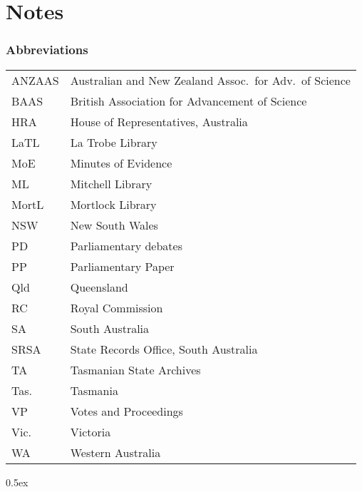 
\chapter{Notes}
\label{ch:notes}


\small

\subsection*{Abbreviations} 

\begin{tabular}{ll}
	ANZAAS	& Australian and New Zealand Assoc.\ for Adv.\ of
                              Science\\
       	BAAS	& British Association for Advancement of Science\\
	HRA	& House of Representatives, Australia\\
	LaTL	& La Trobe Library\\
	MoE	& Minutes of Evidence\\
	ML	& Mitchell Library\\
	MortL	& Mortlock Library\\
	NSW	& New South Wales\\
	PD	& Parliamentary debates\\
	PP	& Parliamentary Paper\\
	Qld	& Queensland\\
	RC	& Royal Commission\\
	SA	& South Australia\\
	SRSA	& State Records Office, South Australia\\
	TA	& Tasmanian State Archives\\
	Tas.	& Tasmania\\
	VP	& Votes and Proceedings\\
	Vic.	& Victoria\\
	WA	& Western Australia\\
\end{tabular}

\begingroup
\parindent 0pt
\parskip   0.5ex
\renewcommand{\enotesize}{\small}
\theendnotes
\endgroup



%
